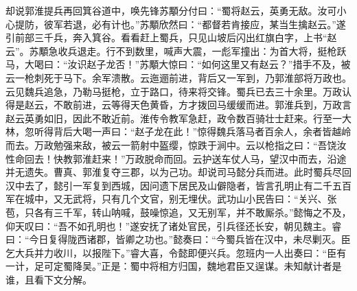 却说郭淮提兵再回箕谷道中，唤先锋苏顒分付曰：“蜀将赵云，英勇无敌。汝可小心提防，彼军若退，必有计也。”苏顒欣然曰：“都督若肯接应，某当生擒赵云。”遂引前部三千兵，奔入箕谷。看看赶上蜀兵，只见山坡后闪出红旗白字，上书“赵云”。苏顒急收兵退走。行不到数里，喊声大震，一彪军撞出：为首大将，挺枪跃马，大喝曰：“汝识赵子龙否！”苏顒大惊曰：“如何这里又有赵云？”措手不及，被云一枪刺死于马下。余军溃散。云迤逦前进，背后又一军到，乃郭淮部将万政也。云见魏兵追急，乃勒马挺枪，立于路口，待来将交锋。蜀兵已去三十余里。万政认得是赵云，不敢前进，云等得天色黄昏，方才拨回马缓缓而进。郭淮兵到，万政言赵云英勇如旧，因此不敢近前。淮传令教军急赶，政令数百骑壮士赶来。行至一大林，忽听得背后大喝一声曰：“赵子龙在此！”惊得魏兵落马者百余人，余者皆越岭而去。万政勉强来敌，被云一箭射中盔缨，惊跌于涧中。云以枪指之曰：“吾饶汝性命回去！快教郭淮赶来！”万政脱命而回。云护送车仗人马，望汉中而去，沿途并无遗失。曹真、郭淮复夺三郡，以为己功。却说司马懿分兵而进。此时蜀兵尽回汉中去了，懿引一军复到西城，因问遗下居民及山僻隐者，皆言孔明止有二千五百军在城中，又无武将，只有几个文官，别无埋伏。武功山小民告曰：“关兴、张苞，只各有三千军，转山呐喊，鼓噪惊追，又无别军，并不敢厮杀。”懿悔之不及，仰天叹曰：“吾不如孔明也！”遂安抚了诸处官民，引兵径还长安，朝见魏主。睿曰：“今日复得陇西诸郡，皆卿之功也。”懿奏曰：“今蜀兵皆在汉中，未尽剿灭。臣乞大兵并力收川，以报陛下。”睿大喜，令懿即便兴兵。忽班内一人出奏曰：“臣有一计，足可定蜀降吴。”正是：蜀中将相方归国，魏地君臣又逞谋。未知献计者是谁，且看下文分解。